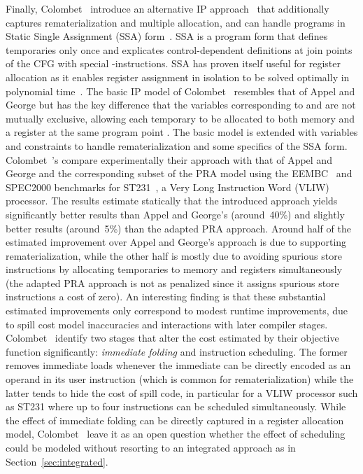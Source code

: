 \documentclass[acmsmall,authorversion,nonacm]{acmart}
\newcommand{\var}[2]{}
\begin{document}
Finally, Colombet~\etal{} introduce an alternative IP
approach~\cite{Colombet2015} that additionally captures
rematerialization and multiple allocation, and can handle programs in
Static Single Assignment (SSA) form~\cite{Cytron1991}.
SSA is a program form that defines temporaries only once and
explicates control-dependent definitions at join points of the CFG
with special -instructions.
SSA has proven itself useful for register allocation as it enables
register assignment in isolation to be solved optimally in polynomial
time~\cite{Hack2006}.
The basic IP model of Colombet~\etal{} resembles that of Appel and
George but has the key difference that the variables corresponding to
\var{r}{t,p} and \var{m}{t,p} are not mutually exclusive, allowing
each temporary  to be allocated to both memory and a register at
the same program point .
The basic model is extended with variables and constraints to handle
rematerialization and some specifics of the SSA form.
Colombet~\etal{}'s compare experimentally their approach with that of
Appel and George and the corresponding subset of the PRA model using
the EEMBC~\cite{Poovey2009} and SPEC2000 benchmarks for
ST231~\cite{Faraboschi2000}, a Very Long Instruction Word (VLIW)
processor.
The results estimate statically that the introduced approach yields
significantly better results than Appel and George's (around~40\%) and
slightly better results (around~5\%) than the adapted PRA approach.
Around half of the estimated improvement over Appel and George's
approach is due to supporting rematerialization, while the other half
is mostly due to avoiding spurious store instructions by allocating
temporaries to memory and registers simultaneously (the adapted PRA
approach is not as penalized since it assigns spurious store
instructions a cost of zero).
An interesting finding is that these substantial estimated
improvements only correspond to modest runtime improvements, due to
spill cost model inaccuracies and interactions with later compiler
stages.
Colombet~\etal{} identify two stages that alter the cost estimated by
their objective function significantly: \emph{immediate folding} and
instruction scheduling.
The former removes immediate loads whenever the immediate can be
directly encoded as an operand in its user instruction (which is
common for rematerialization) while the latter tends to hide the cost
of spill code, in particular for a VLIW processor such as ST231 where
up to four instructions can be scheduled simultaneously.
While the effect of immediate folding can be directly captured in a
register allocation model, Colombet~\etal{} leave it as an open
question whether the effect of scheduling could be modeled without
resorting to an integrated approach as in
Section~\ref{sec:integrated}.
\end{document}
